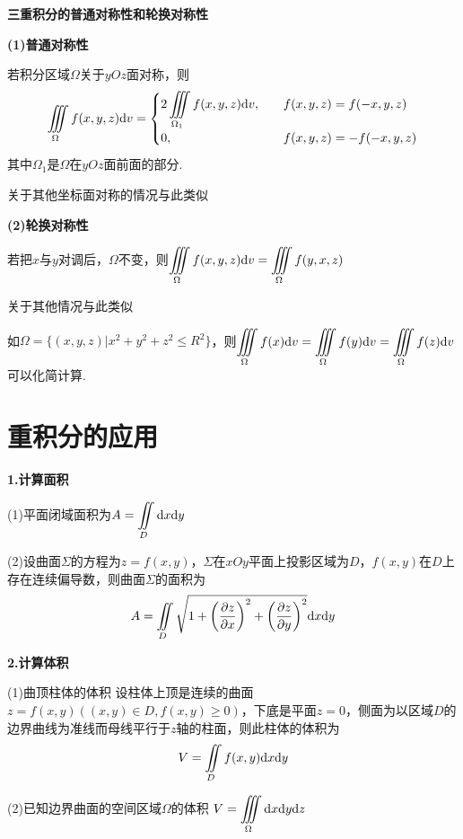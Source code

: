 \textbf{三重积分的普通对称性和轮换对称性}

\textbf{(1)普通对称性}

若积分区域$\Omega$关于$yOz$面对称，则
\begin{equation*}
    \iiint \limits_{\Omega} f(x,y,z)\mathrm{d} v=
    \begin{cases}
        2\displaystyle\iiint \limits_{\Omega_1} f(x,y,z)\mathrm{d} v, \quad & f(x,y,z)=f(-x,y,z) \\
        0,  & f(x,y,z)=-f(-x,y,z)
    \end{cases}
\end{equation*}
其中$\Omega_1$是$\Omega$在$yOz$面前面的部分.

关于其他坐标面对称的情况与此类似

\textbf{(2)轮换对称性}

若把$x$与$y$对调后，$\Omega$不变，则$\displaystyle\iiint\limits_{\Omega}f(x,y,z)\mathrm{d} v=\iiint\limits_{\Omega}f(y,x,z)$

关于其他情况与此类似

如$\Omega=\{(x,y,z)|x^2+y^2+z^2\leq R^2\}$，则$\displaystyle\iiint\limits_{\Omega}f(x)\mathrm{d} v=\iiint\limits_{\Omega}f(y)\mathrm{d} v=\iiint\limits_{\Omega}f(z)\mathrm{d} v$可以化简计算.

\section{重积分的应用}

\textbf{1.计算面积}

(1)平面闭域面积为$\displaystyle A=\iint \limits_{D} \mathrm{d} x\mathrm{d} y$

(2)设曲面$\Sigma$的方程为$z=f(x,y)$，$\Sigma$在$xOy$平面上投影区域为$D$，$f(x,y)$在$D$上存在连续偏导数，则曲面$\Sigma$的面积为
\begin{equation*}
    A=\iint \limits_{D} \sqrt{1+\left(\dfrac{\partial z}{\partial x}\right)^2+\left(\dfrac{\partial z}{\partial y}\right)^2}\mathrm{d} x\mathrm{d} y
\end{equation*}

\textbf{2.计算体积}

(1)曲顶柱体的体积 \quad 设柱体上顶是连续的曲面$z=f(x,y)((x,y)\in D,f(x,y)\geq 0)$，下底是平面$z=0$，侧面为以区域$D$的边界曲线为准线而母线平行于$z$轴的柱面，则此柱体的体积为
\begin{equation*}
    V=\iint \limits_{D} f(x,y)\mathrm{d} x\mathrm{d} y
\end{equation*}

(2)已知边界曲面的空间区域$\Omega$的体积 \quad $V=\displaystyle\iiint \limits_{\Omega}\mathrm{d} x\mathrm{d} y\mathrm{d} z$
